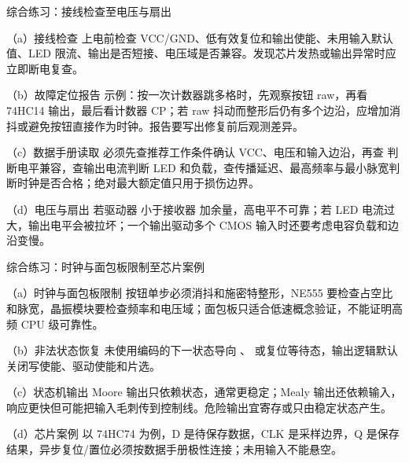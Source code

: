 \begin{chapteranswer}{综合练习：接线检查至电压与扇出}
\begin{answersubproblem}{（a）接线检查}
上电前检查 VCC/GND、低有效复位和输出使能、未用输入默认值、LED 限流、输出是否短接、电压域是否兼容。发现芯片发热或输出异常时应立即断电复查。
\end{answersubproblem}
\begin{answersubproblem}{（b）故障定位报告}
示例：按一次计数器跳多格时，先观察按钮 raw，再看 74HC14 输出，最后看计数器 CP；若 raw 抖动而整形后仍有多个边沿，应增加消抖或避免按钮直接作为时钟。报告要写出修复前后观测差异。
\end{answersubproblem}
\begin{answersubproblem}{（c）数据手册读取}
必须先查推荐工作条件确认 VCC、电压和输入边沿，再查  判断电平兼容，查输出电流判断 LED 和负载，查传播延迟、最高频率与最小脉宽判断时钟是否合格；绝对最大额定值只用于损伤边界。
\end{answersubproblem}
\begin{answersubproblem}{（d）电压与扇出}
若驱动器  小于接收器  加余量，高电平不可靠；若 LED 电流过大，输出电平会被拉坏；一个输出驱动多个 CMOS 输入时还要考虑电容负载和边沿变慢。
\end{answersubproblem}
\end{chapteranswer}

\begin{chapteranswer}{综合练习：时钟与面包板限制至芯片案例}
\begin{answersubproblem}{（a）时钟与面包板限制}
按钮单步必须消抖和施密特整形，NE555 要检查占空比和脉宽，晶振模块要检查频率和电压域；面包板只适合低速概念验证，不能证明高频 CPU 级可靠性。
\end{answersubproblem}
\begin{answersubproblem}{（b）非法状态恢复}
未使用编码的下一状态导向 、 或复位等待态，输出逻辑默认关闭写使能、驱动使能和片选。
\end{answersubproblem}
\begin{answersubproblem}{（c）状态机输出}
Moore 输出只依赖状态，通常更稳定；Mealy 输出还依赖输入，响应更快但可能把输入毛刺传到控制线。危险输出宜寄存或只由稳定状态产生。
\end{answersubproblem}
\begin{answersubproblem}{（d）芯片案例}
以 74HC74 为例，D 是待保存数据，CLK 是采样边界，Q 是保存结果，异步复位/置位必须按数据手册极性连接；未用输入不能悬空。
\end{answersubproblem}
\end{chapteranswer}


